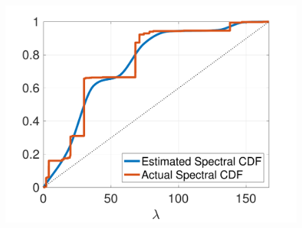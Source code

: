 \documentclass{article}
\begin{document}
\begin{figure}[bt]
\begin{minipage}[m]{0.32\linewidth}
\centerline{~~\includegraphics[width=1.1\linewidth]{fig_net25_cdf}}
\end{minipage}
\\
\vspace{0.03\linewidth}



\end{figure}
\end{document}
